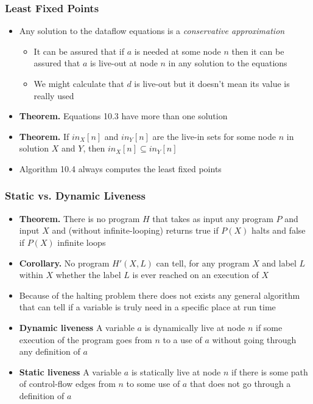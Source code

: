 \documentclass[11pt]{article}
\begin{document}
\subsubsection{Least Fixed Points}
\label{sec:orgad74afa}
\begin{itemize}
\item Any solution to the dataflow equations is a \emph{conservative approximation}
\begin{itemize}
\item It can be assured that if \(a\) is needed at some node \(n\) then it can be assured that \(a\) is live-out at node \(n\) in any solution to the equations
\item We might calculate that \(d\) is live-out but it doesn't mean its value is really used
\end{itemize}

\item \textbf{Theorem.} Equations 10.3 have more than one solution
\item \textbf{Theorem.} If \(in_X[n]\) and \(in_Y[n]\) are the live-in sets for some node \(n\) in solution \(X\) and \(Y\), then \(in_X[n] \subseteq in_Y[n]\)

\item Algorithm 10.4 always computes the least fixed points
\end{itemize}

\subsubsection{Static vs. Dynamic Liveness}
\label{sec:org7a1cc41}
\begin{itemize}
\item \textbf{Theorem.} There is no program \(H\) that takes as input any program \(P\) and input \(X\) and (without infinite-looping) returns true if \(P(X)\) halts and false if \(P(X)\) infinite loops
\item \textbf{Corollary.} No program \(H'(X,L)\) can tell, for any program \(X\) and label \(L\) within \(X\) whether the label \(L\) is ever reached on an execution of \(X\)
\item Because of the halting problem there does not exists any general algorithm that can tell if a variable is truly need in a specific place at run time
\item \textbf{Dynamic liveness} A variable \(a\) is dynamically live at node \(n\) if some execution of the program goes from \(n\) to a use of \(a\) without going through any definition of \(a\)
\item \textbf{Static liveness} A variable \(a\) is statically live at node \(n\) if there is some path of control-flow edges from \(n\) to some use of \(a\) that does not go through a definition of \(a\)
\end{itemize}
\end{document}
